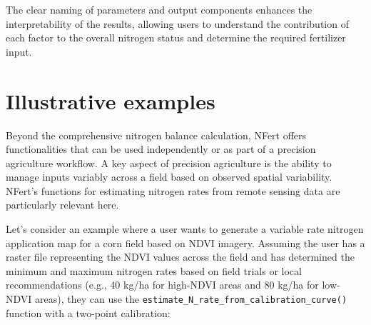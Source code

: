 \documentclass[
  11pt,
]{article}
\begin{document}
The clear naming of parameters and output components enhances the
interpretability of the results, allowing users to understand the
contribution of each factor to the overall nitrogen status and determine
the required fertilizer input.

\section{Illustrative examples}\label{illustrative-examples}

Beyond the comprehensive nitrogen balance calculation, NFert offers
functionalities that can be used independently or as part of a precision
agriculture workflow. A key aspect of precision agriculture is the
ability to manage inputs variably across a field based on observed
spatial variability. NFert's functions for estimating nitrogen rates
from remote sensing data are particularly relevant here.

Let's consider an example where a user wants to generate a variable rate
nitrogen application map for a corn field based on NDVI imagery.
Assuming the user has a raster file representing the NDVI values across
the field and has determined the minimum and maximum nitrogen rates
based on field trials or local recommendations (e.g., 40 kg/ha for
high-NDVI areas and 80 kg/ha for low-NDVI areas), they can use the
\texttt{estimate\_N\_rate\_from\_calibration\_curve()} function with a
two-point calibration:
\end{document}
